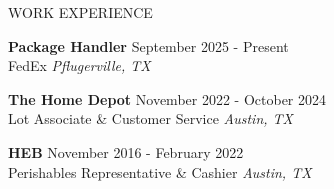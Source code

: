 \documentclass{resume} %
\begin{document}
\begin{rSection}{WORK EXPERIENCE}

\textbf{Package Handler} \hfill September 2025 - Present \\
FedEx \hfill \textit{Pflugerville, TX}
 
\textbf{The Home Depot} \hfill November 2022 - October 2024 \\
Lot Associate \& Customer Service \hfill \textit{Austin, TX}

\textbf{HEB} \hfill November 2016 - February 2022 \\
Perishables Representative \& Cashier \hfill \textit{Austin, TX}
\end{rSection} 


%
\end{document}
